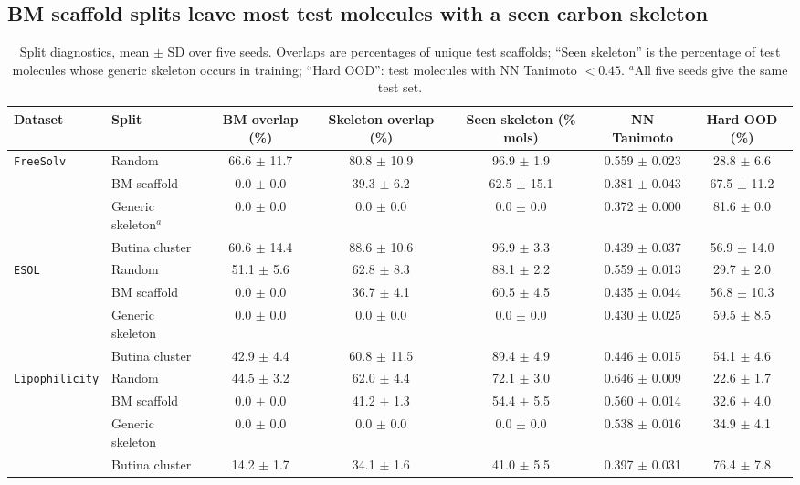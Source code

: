 \documentclass[journal=jcisd8,manuscript=article]{achemso}
\begin{document}
\subsection{BM scaffold splits leave most test molecules with a seen carbon skeleton}
\begin{table}
\caption{Split diagnostics, mean $\pm$ SD over five seeds. Overlaps are percentages of unique test scaffolds; ``Seen skeleton'' is the percentage of test molecules whose generic skeleton occurs in training; ``Hard OOD'': test molecules with NN Tanimoto $< 0.45$. $^{a}$All five seeds give the same test set.}
\label{tab:splits}
\scriptsize
\begin{tabular}{llccccc}
\toprule
Dataset & Split & BM overlap (\%) & Skeleton overlap (\%) & Seen skeleton (\% mols) & NN Tanimoto & Hard OOD (\%) \\
\midrule
\texttt{FreeSolv} & Random & 66.6 $\pm$ 11.7 & 80.8 $\pm$ 10.9 & 96.9 $\pm$ 1.9 & 0.559 $\pm$ 0.023 & 28.8 $\pm$ 6.6 \\
 & BM scaffold & 0.0 $\pm$ 0.0 & 39.3 $\pm$ 6.2 & 62.5 $\pm$ 15.1 & 0.381 $\pm$ 0.043 & 67.5 $\pm$ 11.2 \\
 & Generic skeleton$^{a}$ & 0.0 $\pm$ 0.0 & 0.0 $\pm$ 0.0 & 0.0 $\pm$ 0.0 & 0.372 $\pm$ 0.000 & 81.6 $\pm$ 0.0 \\
 & Butina cluster & 60.6 $\pm$ 14.4 & 88.6 $\pm$ 10.6 & 96.9 $\pm$ 3.3 & 0.439 $\pm$ 0.037 & 56.9 $\pm$ 14.0 \\
\midrule
\texttt{ESOL} & Random & 51.1 $\pm$ 5.6 & 62.8 $\pm$ 8.3 & 88.1 $\pm$ 2.2 & 0.559 $\pm$ 0.013 & 29.7 $\pm$ 2.0 \\
 & BM scaffold & 0.0 $\pm$ 0.0 & 36.7 $\pm$ 4.1 & 60.5 $\pm$ 4.5 & 0.435 $\pm$ 0.044 & 56.8 $\pm$ 10.3 \\
 & Generic skeleton & 0.0 $\pm$ 0.0 & 0.0 $\pm$ 0.0 & 0.0 $\pm$ 0.0 & 0.430 $\pm$ 0.025 & 59.5 $\pm$ 8.5 \\
 & Butina cluster & 42.9 $\pm$ 4.4 & 60.8 $\pm$ 11.5 & 89.4 $\pm$ 4.9 & 0.446 $\pm$ 0.015 & 54.1 $\pm$ 4.6 \\
\midrule
\texttt{Lipophilicity} & Random & 44.5 $\pm$ 3.2 & 62.0 $\pm$ 4.4 & 72.1 $\pm$ 3.0 & 0.646 $\pm$ 0.009 & 22.6 $\pm$ 1.7 \\
 & BM scaffold & 0.0 $\pm$ 0.0 & 41.2 $\pm$ 1.3 & 54.4 $\pm$ 5.5 & 0.560 $\pm$ 0.014 & 32.6 $\pm$ 4.0 \\
 & Generic skeleton & 0.0 $\pm$ 0.0 & 0.0 $\pm$ 0.0 & 0.0 $\pm$ 0.0 & 0.538 $\pm$ 0.016 & 34.9 $\pm$ 4.1 \\
 & Butina cluster & 14.2 $\pm$ 1.7 & 34.1 $\pm$ 1.6 & 41.0 $\pm$ 5.5 & 0.397 $\pm$ 0.031 & 76.4 $\pm$ 7.8 \\

\end{tabular}
\end{table}
\end{document}
